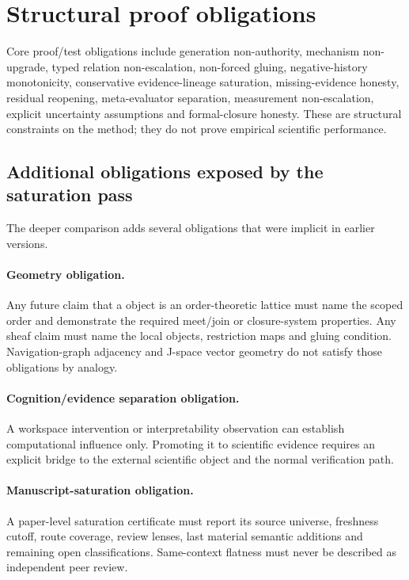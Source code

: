 \section{Structural proof obligations}
Core proof/test obligations include generation non-authority, mechanism non-upgrade, typed relation non-escalation, non-forced gluing, negative-history monotonicity, conservative evidence-lineage saturation, missing-evidence honesty, residual reopening, meta-evaluator separation, measurement non-escalation, explicit uncertainty assumptions and formal-closure honesty. These are structural constraints on the method; they do not prove empirical scientific performance.

\sloppy
\small
\setlength{\emergencystretch}{3em}
\subsection{Additional obligations exposed by the saturation pass}

The deeper comparison adds several obligations that were implicit in earlier versions.

\paragraph{Geometry obligation.}
Any future claim that a \RAKL{} object is an order-theoretic lattice must name the scoped order and demonstrate the required meet/join or closure-system properties. Any sheaf claim must name the local objects, restriction maps and gluing condition. Navigation-graph adjacency and J-space vector geometry do not satisfy those obligations by analogy.

\paragraph{Cognition/evidence separation obligation.}
A workspace intervention or interpretability observation can establish computational influence only. Promoting it to scientific evidence requires an explicit bridge to the external scientific object and the normal verification path.

\paragraph{Manuscript-saturation obligation.}
A paper-level saturation certificate must report its source universe, freshness cutoff, route coverage, review lenses, last material semantic additions and remaining open classifications. Same-context flatness must never be described as independent peer review.

